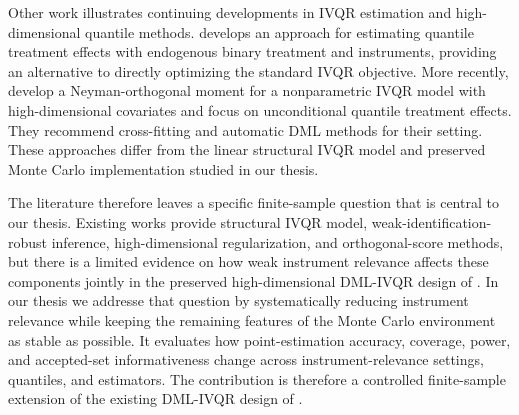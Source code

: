 Other work illustrates continuing developments in IVQR estimation and high-dimensional quantile methods. \textcite{wuthrich_2019} develops an approach for estimating quantile treatment effects with endogenous binary treatment and instruments, providing an alternative to directly optimizing the standard IVQR objective. More recently, \textcite{jin_sun_2025} develop a Neyman-orthogonal moment for a nonparametric IVQR model with high-dimensional covariates and focus on unconditional quantile treatment effects. They recommend cross-fitting and automatic DML methods for their setting. These approaches differ from the linear structural IVQR model and preserved Monte Carlo implementation studied in our thesis.

The literature therefore leaves a specific finite-sample question that is central to our thesis. Existing works provide structural IVQR model, weak-identification-robust inference, high-dimensional regularization, and orthogonal-score methods, but there is a limited evidence on how weak instrument relevance affects these components jointly in the preserved high-dimensional DML-IVQR design of \textcite{chen_huang_tien_2021}. In our thesis we addresse that question by systematically reducing instrument relevance while keeping the remaining features of the Monte Carlo environment as stable as possible. It evaluates how point-estimation accuracy, coverage, power, and accepted-set informativeness change across instrument-relevance settings, quantiles, and estimators. The contribution is therefore a controlled finite-sample extension of the existing DML-IVQR design of \textcite{chen_huang_tien_2021}.
